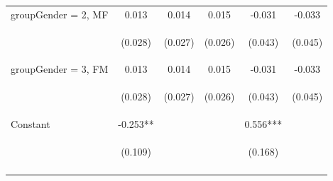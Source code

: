 \documentclass{article} %
\begin{document}
\begin{table}[H]
\begin{center}
\begin{tabular}{lccccc}
groupGender = 2, MF & 0.013 & 0.014 & 0.015 & -0.031 & -0.033 \\
\vspace{4pt} & \begin{footnotesize}(0.028)\end{footnotesize} & \begin{footnotesize}(0.027)\end{footnotesize} & \begin{footnotesize}(0.026)\end{footnotesize} & \begin{footnotesize}(0.043)\end{footnotesize} & \begin{footnotesize}(0.045)\end{footnotesize} \\
groupGender = 3, FM & 0.013 & 0.014 & 0.015 & -0.031 & -0.033 \\
\vspace{4pt} & \begin{footnotesize}(0.028)\end{footnotesize} & \begin{footnotesize}(0.027)\end{footnotesize} & \begin{footnotesize}(0.026)\end{footnotesize} & \begin{footnotesize}(0.043)\end{footnotesize} & \begin{footnotesize}(0.045)\end{footnotesize} \\
Constant & -0.253** &  &  & 0.556*** &  \\
 & \begin{footnotesize}(0.109)\end{footnotesize} & \begin{footnotesize}\end{footnotesize} & \begin{footnotesize}\end{footnotesize} & \begin{footnotesize}(0.168)\end{footnotesize} & \begin{footnotesize}\end{footnotesize} \\
\vspace{4pt} & \begin{footnotesize}\end{footnotesize} & \begin{footnotesize}\end{footnotesize} & \begin{footnotesize}\end{footnotesize} & \begin{footnotesize}\end{footnotesize} & \begin{footnotesize}\end{footnotesize} \\

\end{tabular}
\end{center}
\end{table}
\end{document}
